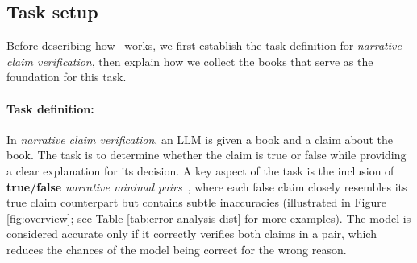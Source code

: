 \vspace{-0.05in}
\subsection{Task setup}

Before describing how \pipeline\ works, we first establish the task definition for \textit{narrative claim verification}, then explain how we collect the books that serve as the foundation for this task.

\paragraph{Task definition:}
In \textit{narrative claim verification}, an LLM is given a book and a claim about the book. The task is to determine whether the claim is true or false while providing a clear explanation for its decision. A key aspect of the task is the inclusion of \textbf{true/false} \textit{narrative minimal pairs}~\cite{karpinska_one_2024}, where each false claim closely resembles its true claim counterpart but contains subtle inaccuracies (illustrated in Figure \ref{fig:overview}; see Table \ref{tab:error-analysis-dist} for more examples). The model is considered accurate only if it correctly verifies both claims in a pair, which reduces the chances of the model being correct for the wrong reason.

